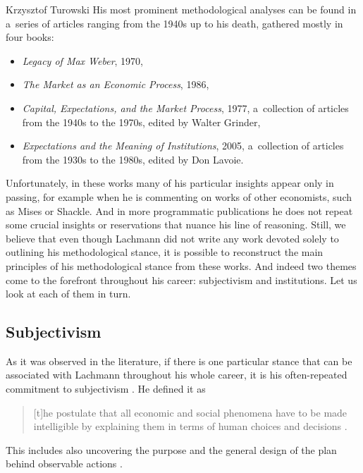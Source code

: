 \begin{artengenv}{Krzysztof Turowski}
His most prominent methodological analyses can be found in a~series of articles ranging from the 1940s up to his death, gathered mostly in four books:
\begin{itemize}
\item \emph{Legacy of Max Weber}, 1970,
\item \emph{The Market as an Economic Process}, 1986,
\item \emph{Capital, Expectations, and the Market Process}, 1977, a~collection of articles from the 1940s to the 1970s, edited by Walter Grinder,
\item \emph{Expectations and the Meaning of Institutions}, 2005, a~collection of articles from the 1930s to the 1980s, edited by Don Lavoie.
\end{itemize}
Unfortunately, in these works many of his particular insights appear only in passing, for example when he is commenting on works of other economists, such as Mises or Shackle. And in more programmatic publications he does not repeat some crucial insights or reservations that nuance his line of reasoning.
Still, we believe that even though Lachmann did not write any work devoted solely to outlining his methodological stance, it is possible to reconstruct the main principles of his methodological stance from these works. And indeed two themes come to the forefront throughout his career: subjectivism and institutions. Let us look at each of them in turn.

\subsection{Subjectivism}


As it was observed in the literature, if there is one particular stance that can be associated with Lachmann throughout his whole career, it is his often-repeated commitment to subjectivism \parencite[3]{grinder-introduction}. He defined it as
\begin{quote}
[t]he postulate that all economic and social phenomena have to be made intelligible by explaining them in terms of human choices and decisions \parencite[10]{lachmann1973macro}.
\end{quote}
This includes also uncovering the purpose and the general design of the plan behind observable actions \parencite[71--72]{lachmann-expectations}.


\end{artengenv}
